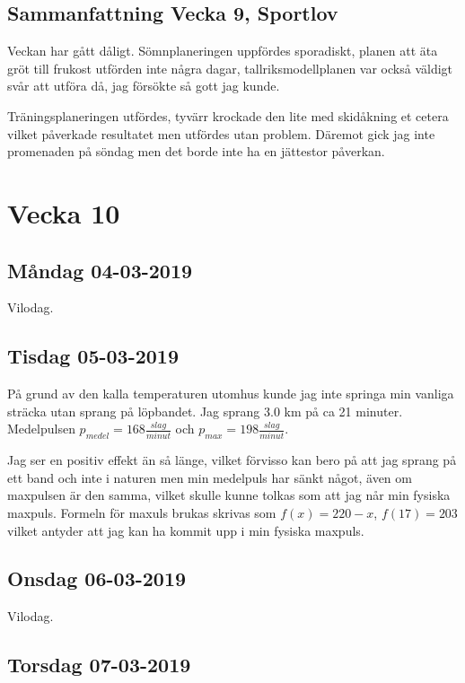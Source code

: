 \documentclass[a4paper, 12pt]{article}
\begin{document}
\subsection{Sammanfattning Vecka 9, Sportlov}

    Veckan har gått dåligt. Sömnplaneringen uppfördes sporadiskt, planen att äta gröt till frukost utförden inte några dagar, tallriksmodellplanen var också väldigt svår att utföra då, jag försökte så gott jag kunde.
    
    Träningsplaneringen utfördes, tyvärr krockade den lite med skidåkning et cetera vilket påverkade resultatet men utfördes utan problem. Däremot gick jag inte promenaden på söndag men det borde inte ha en jättestor påverkan. 

\section{Vecka 10}

\subsection{Måndag 04-03-2019}

    Vilodag.

\subsection{Tisdag 05-03-2019}

    På grund av den kalla temperaturen utomhus kunde jag inte springa min vanliga sträcka utan sprang på löpbandet. Jag sprang 3.0 km på ca 21 minuter. Medelpulsen $p_{medel} = 168\frac{slag}{minut}$ och $p_{max} = 198\frac{slag}{minut}$.
    
    Jag ser en positiv effekt än så länge, vilket förvisso kan bero på att jag sprang på ett band och inte i naturen men min medelpuls har sänkt något, även om maxpulsen är den samma, vilket skulle kunne tolkas som att jag når min fysiska maxpuls. Formeln för maxuls brukas skrivas som $f(x) = 220 - x$, $f(17) = 203$ vilket antyder att jag kan ha kommit upp i min fysiska maxpuls. 

\subsection{Onsdag 06-03-2019}

    Vilodag.

\subsection{Torsdag 07-03-2019}
\end{document}
